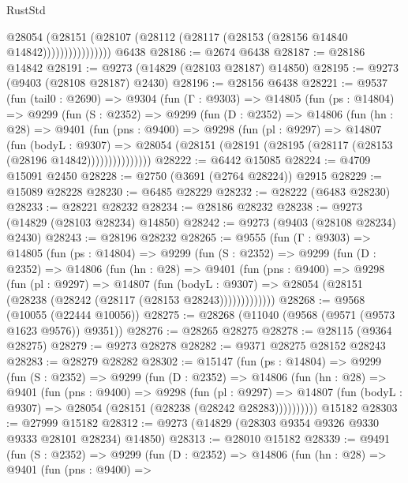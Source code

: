 \begin{lexlean}{RustStd}
\begin{coremodule}
{\begin{coremodule}
{{{{{{{{{{{{{{{{{{{{{{{{{{{{{{{{{{{{{{{{{{{{{{{{{{{{{{{                      @28054
                        (@28151
                          (@28107 (@28112 (@28117 (@28153 (@28156 @14840 @14842))))))))))))))))
    @6438
@28186 := @2674 @6438
@28187 := @28186 @14842
@28191 := @9273 (@14829 (@28103 @28187) @14850)
@28195 := @9273 (@9403 (@28108 @28187) @2430)
@28196 := @28156 @6438
@28221 := @9537
    (fun (tail0 : @2690) =>
    @9304
      (fun (Γ : @9303) =>
      @14805
        (fun (ps : @14804) =>
        @9299
          (fun (S : @2352) =>
          @9299
            (fun (D : @2352) =>
            @14806
              (fun (hn : @28) =>
              @9401
                (fun (pns : @9400) =>
                @9298
                  (fun (pl : @9297) =>
                  @14807
                    (fun (bodyL : @9307) =>
                    @28054 (@28151 (@28191 (@28195 (@28117 (@28153 (@28196 @14842)))))))))))))))
@28222 := @6442 @15085
@28224 := @4709 @15091 @2450
@28228 := @2750 (@3691 (@2764 @28224)) @2915
@28229 := @15089 @28228
@28230 := @6485 @28229
@28232 := @28222 (@6483 @28230)
@28233 := @28221 @28232
@28234 := @28186 @28232
@28238 := @9273 (@14829 (@28103 @28234) @14850)
@28242 := @9273 (@9403 (@28108 @28234) @2430)
@28243 := @28196 @28232
@28265 := @9555
    (fun (Γ : @9303) =>
    @14805
      (fun (ps : @14804) =>
      @9299
        (fun (S : @2352) =>
        @9299
          (fun (D : @2352) =>
          @14806
            (fun (hn : @28) =>
            @9401
              (fun (pns : @9400) =>
              @9298
                (fun (pl : @9297) =>
                @14807
                  (fun (bodyL : @9307) =>
                  @28054 (@28151 (@28238 (@28242 (@28117 (@28153 @28243)))))))))))))
@28268 := @9568 (@10055 (@22444 @10056))
@28275 := @28268 (@11040 (@9568 (@9571 (@9573 @1623 @9576)) @9351))
@28276 := @28265 @28275
@28278 := @28115 (@9364 @28275)
@28279 := @9273 @28278
@28282 := @9371 @28275 @28152 @28243
@28283 := @28279 @28282
@28302 := @15147
    (fun (ps : @14804) =>
    @9299
      (fun (S : @2352) =>
      @9299
        (fun (D : @2352) =>
        @14806
          (fun (hn : @28) =>
          @9401
            (fun (pns : @9400) =>
            @9298
              (fun (pl : @9297) =>
              @14807 (fun (bodyL : @9307) => @28054 (@28151 (@28238 (@28242 @28283))))))))))
    @15182
@28303 := @27999 @15182
@28312 := @9273 (@14829 (@28303 @9354 @9326 @9330 @9333 @28101 @28234) @14850)
@28313 := @28010 @15182
@28339 := @9491
    (fun (S : @2352) =>
    @9299
      (fun (D : @2352) =>
      @14806
        (fun (hn : @28) =>
        @9401
          (fun (pns : @9400) =>
}}}}}}}}}}}}}}}}}}}}}}}}}}}}}}}}}}}}}}}}}}}}}}}}}}}}}}}
\end{coremodule}}
\end{coremodule}
\end{lexlean}
